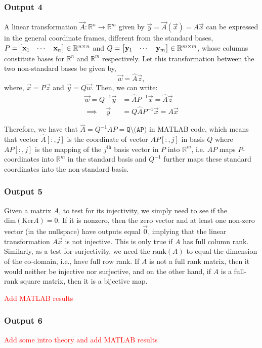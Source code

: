 \documentclass[10pt]{article}
\begin{document}
\subsubsection{Output 4}
A linear transformation $\vec{A} : \mathbb{R}^n \rightarrow \mathbb{R}^m$ given by $\vec{y} = \vec{A}(\vec{x}) = A\vec{x}$ can be expressed in the general coordinate frames, different from the standard bases, $P = \begin{bmatrix} \mathbf{x}_1 & \cdots & \mathbf{x}_n \end{bmatrix} \in \mathbb{R}^{n\times n}$ and $Q = \begin{bmatrix} \mathbf{y}_1 & \cdots & \mathbf{y}_m \end{bmatrix} \in \mathbb{R}^{m\times m}$, whose columns constitute bases for $\mathbb{R}^n$ and $\mathbb{R}^m$ respectively. Let this transformation between the two non-standard bases be given by,
\[
    \vec{w}=\hat{A}\vec{z},
\]
where, $\vec{x}=P\vec{z}$ and $\vec{y} = Q\vec{w}$. Then, we can write:
\begin{align*}
    \vec{w} = Q^{-1}\vec{y} &= \hat{A}P^{-1}\vec{x} = \hat{A}\vec{z}\\
    \implies \quad \vec{y} &= Q\hat{A}P^{-1}\vec{x} = A\vec{x}
\end{align*}

Therefore, we have that $\hat{A} = Q^{-1}AP=\texttt{Q\textbackslash (AP)}$ in \textsc{MATLAB} code, which means that vector ${\hat{A}}[:, j]$ is the coordinate of vector $AP[:, j]$ in basis $Q$ where $AP[:, j]$ is the mapping of the $j^{\text{th}}$ basis vector in $P$ into $\mathbb{R}^m$, i.e. $AP$ maps $P$-coordinates into $\mathbb{R}^m$ in the standard basis and $Q^{-1}$ further maps these standard coordinates into the non-standard basis.

\subsubsection{Output 5}
Given a matrix $A$, to test for its injectivity, we simply need to see if the $\text{dim}(\text{Ker}A) = 0$. If it is nonzero, then the zero vector and at least one non-zero vector (in the nullspace) have outputs equal $\vec{0}$, implying that the linear transformation $A\vec{x}$ is not injective. This is only true if $A$ has full column rank. Similarly, as a test for surjectivity, we need the $\text{rank}(A)$ to equal the dimension of the co-domain, i.e., have full row rank. If $A$ is not a full rank matrix, then it would neither be injective nor surjective, and on the other hand, if $A$ is a full-rank square matrix, then it is a bijective map.

\textcolor{red}{Add MATLAB results}

\subsubsection{Output 6}
\textcolor{red}{Add some intro theory and add MATLAB results}
\end{document}
